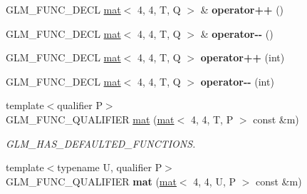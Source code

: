 \begin{DoxyCompactItemize}
\item 
\mbox{\label{structglm_1_1mat_3_014_00_014_00_01T_00_01Q_01_4_a39435dc193ef8ac3a8c417651ae6440e}} 
G\+L\+M\+\_\+\+F\+U\+N\+C\+\_\+\+D\+E\+CL \hyperlink{structglm_1_1mat}{mat}$<$ 4, 4, T, Q $>$ \& {\bfseries operator++} ()
\item 
\mbox{\label{structglm_1_1mat_3_014_00_014_00_01T_00_01Q_01_4_a3c62ee9d03614c428b3e7d81dac27f8c}} 
G\+L\+M\+\_\+\+F\+U\+N\+C\+\_\+\+D\+E\+CL \hyperlink{structglm_1_1mat}{mat}$<$ 4, 4, T, Q $>$ \& {\bfseries operator-\/-\/} ()
\item 
\mbox{\label{structglm_1_1mat_3_014_00_014_00_01T_00_01Q_01_4_a63e4b9e5fd2328e10fe75fec5ab1a10b}} 
G\+L\+M\+\_\+\+F\+U\+N\+C\+\_\+\+D\+E\+CL \hyperlink{structglm_1_1mat}{mat}$<$ 4, 4, T, Q $>$ {\bfseries operator++} (int)
\item 
\mbox{\label{structglm_1_1mat_3_014_00_014_00_01T_00_01Q_01_4_a3f3b1e563c8dcf771cb1ab9767869232}} 
G\+L\+M\+\_\+\+F\+U\+N\+C\+\_\+\+D\+E\+CL \hyperlink{structglm_1_1mat}{mat}$<$ 4, 4, T, Q $>$ {\bfseries operator-\/-\/} (int)
\item 
\mbox{\label{structglm_1_1mat_3_014_00_014_00_01T_00_01Q_01_4_a8c26362d4f474e5e811eeb8257b3f728}} 
{\footnotesize template$<$qualifier P$>$ }\\G\+L\+M\+\_\+\+F\+U\+N\+C\+\_\+\+Q\+U\+A\+L\+I\+F\+I\+ER \hyperlink{structglm_1_1mat_3_014_00_014_00_01T_00_01Q_01_4_a8c26362d4f474e5e811eeb8257b3f728}{mat} (\hyperlink{structglm_1_1mat}{mat}$<$ 4, 4, T, P $>$ const \&m)
\begin{DoxyCompactList}\small\item\em G\+L\+M\+\_\+\+H\+A\+S\+\_\+\+D\+E\+F\+A\+U\+L\+T\+E\+D\+\_\+\+F\+U\+N\+C\+T\+I\+O\+NS. \end{DoxyCompactList}\item 
\mbox{\label{structglm_1_1mat_3_014_00_014_00_01T_00_01Q_01_4_a75be29372bf5753b3bae4cc220f7f42e}} 
{\footnotesize template$<$typename U, qualifier P$>$ }\\G\+L\+M\+\_\+\+F\+U\+N\+C\+\_\+\+Q\+U\+A\+L\+I\+F\+I\+ER {\bfseries mat} (\hyperlink{structglm_1_1mat}{mat}$<$ 4, 4, U, P $>$ const \&m)

\end{DoxyCompactItemize}
